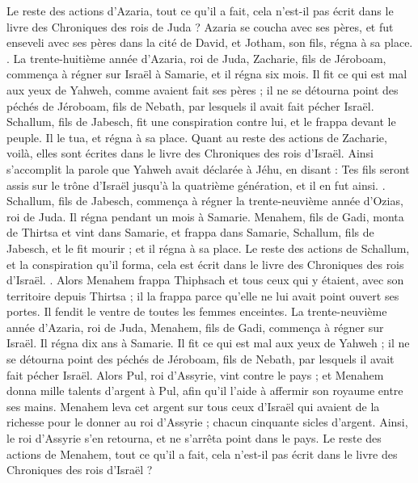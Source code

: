 \begin{multicols}{2}
Le reste des actions d'Azaria, tout ce qu'il a fait, cela n'est-il pas écrit dans le livre des Chroniques des rois de Juda ?
Azaria se coucha avec ses pères, et fut enseveli avec ses pères dans la cité de David, et Jotham, son fils, régna à sa place.
.
La trente-huitième année d'Azaria, roi de Juda, Zacharie, fils de Jéroboam, commença à régner sur Israël à Samarie, et il régna six mois.
Il fit ce qui est mal aux yeux de Yahweh, comme avaient fait ses pères ; il ne se détourna point des péchés de Jéroboam, fils de Nebath, par lesquels il avait fait pécher Israël.
Schallum, fils de Jabesch, fit une conspiration contre lui, et le frappa devant le peuple. Il le tua, et régna à sa place.
Quant au reste des actions de Zacharie, voilà, elles sont écrites dans le livre des Chroniques des rois d'Israël.
Ainsi s'accomplit la parole que Yahweh avait déclarée à Jéhu, en disant : Tes fils seront assis sur le trône d'Israël jusqu'à la quatrième génération, et il en fut ainsi.
.
Schallum, fils de Jabesch, commença à régner la trente-neuvième année d'Ozias, roi de Juda. Il régna pendant un mois à Samarie.
Menahem, fils de Gadi, monta de Thirtsa et vint dans Samarie, et frappa dans Samarie, Schallum, fils de Jabesch, et le fit mourir ; et il régna à sa place.
Le reste des actions de Schallum, et la conspiration qu'il forma, cela est écrit dans le livre des Chroniques des rois d'Israël.
.
Alors Menahem frappa Thiphsach et tous ceux qui y étaient, avec son territoire depuis Thirtsa ; il la frappa parce qu'elle ne lui avait point ouvert ses portes. Il fendit le ventre de toutes les femmes enceintes.
La trente-neuvième année d'Azaria, roi de Juda, Menahem, fils de Gadi, commença à régner sur Israël. Il régna dix ans à Samarie.
Il fit ce qui est mal aux yeux de Yahweh ; il ne se détourna point des péchés de Jéroboam, fils de Nebath, par lesquels il avait fait pécher Israël.
Alors Pul, roi d'Assyrie, vint contre le pays ; et Menahem donna mille talents d'argent à Pul, afin qu'il l'aide à affermir son royaume entre ses mains.
Menahem leva cet argent sur tous ceux d'Israël qui avaient de la richesse pour le donner au roi d'Assyrie ; chacun cinquante sicles d'argent. Ainsi, le roi d'Assyrie s'en retourna, et ne s'arrêta point dans le pays.
Le reste des actions de Menahem, tout ce qu'il a fait, cela n'est-il pas écrit dans le livre des Chroniques des rois d'Israël ?

\end{multicols}
